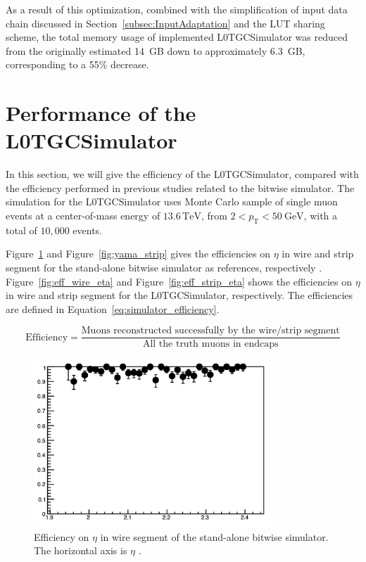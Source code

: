 As a result of this optimization, combined with the simplification of input data chain discussed in Section~\ref{subsec:InputAdaptation} and the LUT sharing scheme, the total memory usage of implemented L0TGCSimulator was reduced from the originally estimated 14~GB down to approximately 6.3~GB, corresponding to a 55\% decrease.

\section{Performance of the L0TGCSimulator} \label{sec:L0MuonS1TGCPerformance}
In this section, we will give the efficiency of the L0TGCSimulator, compared with the efficiency performed in previous studies related to the bitwise simulator. The simulation for the L0TGCSimulator uses Monte Carlo sample of single muon events at a center-of-mass energy of $13.6\,\mathrm{TeV}$, from $2 < p_\mathrm{T} < 50~\text{GeV}$, with a total of $10{,}000$ events.

Figure~\ref{fig:yama_wire} and Figure~\ref{fig:yama_strip} gives the efficiencies on $\eta$ in wire and strip segment for the stand-alone bitwise simulator as references, respectively \cite{yamashita}. Figure~\ref{fig:eff_wire_eta} and Figure~\ref{fig:eff_strip_eta} shows the efficiencies on $\eta$ in wire and strip segment for the L0TGCSimulator, respectively. The efficiencies are defined in Equation~\ref{eq:simulator_efficiency}. 

\begin{equation}
\label{eq:simulator_efficiency}
\mathrm{Efficiency} = \frac{\text{Muons reconstructed successfully by the wire/strip segment}}{\text{All the truth muons in endcaps}}
\end{equation}

\begin{figure}[htbp]
  \centering
  \includegraphics[width=0.8\textwidth]{figs/chapter5/yamashita_wire_eff.png}
  \caption{Efficiency on $\eta$ in wire segment of the stand-alone bitwise simulator. The horizontal axis is $\eta$ \cite{yamashita}.}
  \label{fig:yama_wire}
\end{figure}

